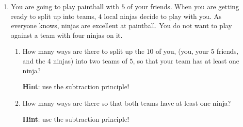 \documentclass[11pt]{article}
\begin{document}
\begin{enumerate}
{\bf Hint}: show the LHS and RHS count the same things in two different ways, much as we proved that $\sum_k \binom{n}{k}^2 = \binom{2n}{n}$ in L9.




\item You are going to play paintball with $5$ of your friends.  When you are getting ready to split up into teams, $4$ local ninjas decide to play with you.  As everyone knows, ninjas are excellent at paintball.  You do not want to play against a team with four ninjas on it.  
\begin{enumerate}
\item How many ways are there to split up the $10$ of you, (you, your $5$ friends, and the $4$ ninjas)  into two teams of $5$, so that your team has at least one ninja? 

{\bf Hint}: use the subtraction principle!

\item How many ways are there so that both teams have at least one ninja?

{\bf Hint}: use the subtraction principle!

\end{enumerate}







\end{enumerate}
\end{document}
